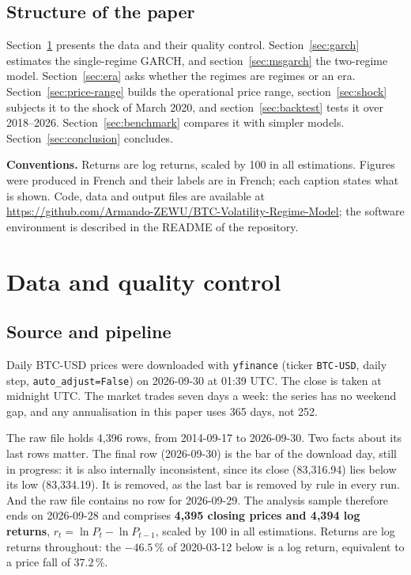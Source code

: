 \documentclass[12pt,a4paper]{article}
\begin{document}
\subsection{Structure of the paper}

Section~\ref{sec:data} presents the data and their quality control. Section~\ref{sec:garch} estimates the single-regime GARCH, and section~\ref{sec:msgarch} the two-regime model. Section~\ref{sec:era} asks whether the regimes are regimes or an era. Section~\ref{sec:price-range} builds the operational price range, section~\ref{sec:shock} subjects it to the shock of March 2020, and section~\ref{sec:backtest} tests it over 2018--2026. Section~\ref{sec:benchmark} compares it with simpler models. Section~\ref{sec:conclusion} concludes.

\medskip
\noindent\textbf{Conventions.} Returns are log returns, scaled by 100 in all estimations. Figures were produced in French and their labels are in French; each caption states what is shown. Code, data and output files are available at \url{https://github.com/Armando-ZEWU/BTC-Volatility-Regime-Model}; the software environment is described in the README of the repository.


\section{Data and quality control}
\label{sec:data}

\subsection{Source and pipeline}
\label{sec:data-pipeline}

Daily BTC-USD prices were downloaded with \texttt{yfinance} (ticker \texttt{BTC-USD}, daily step, \texttt{auto\_\allowbreak{}adjust=False}) on 2026-09-30 at 01:39 UTC. The close is taken at midnight UTC. The market trades seven days a week: the series has no weekend gap, and any annualisation in this paper uses 365 days, not 252.

The raw file holds 4,396 rows, from 2014-09-17 to 2026-09-30. Two facts about its last rows matter. The final row (2026-09-30) is the bar of the download day, still in progress: it is also internally inconsistent, since its close (83,316.94) lies below its low (83,334.19). It is removed, as the last bar is removed by rule in every run. And the raw file contains no row for 2026-09-29. The analysis sample therefore ends on 2026-09-28 and comprises \textbf{4,395 closing prices and 4,394 log returns}, $r_t = \ln P_t - \ln P_{t-1}$, scaled by 100 in all estimations. Returns are log returns throughout: the $-46.5\,\%$ of 2020-03-12 below is a log return, equivalent to a price fall of $37.2\,\%$.
\end{document}

